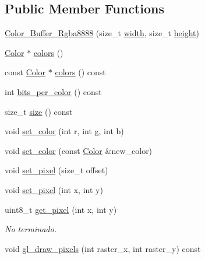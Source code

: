 \subsection*{Public Member Functions}
\begin{DoxyCompactItemize}
\item 
\mbox{\hyperlink{classexample_1_1_color___buffer___rgba8888_aa5397ac3ceb62d95d0f4773205d98177}{Color\+\_\+\+Buffer\+\_\+\+Rgba8888}} (size\+\_\+t \mbox{\hyperlink{classexample_1_1_color___buffer_ab61454d4b35cbba00d2e634d14ed20ac}{width}}, size\+\_\+t \mbox{\hyperlink{classexample_1_1_color___buffer_ae01f4538ee30af1d3072a425c5ad37ac}{height}})
\item 
\mbox{\hyperlink{structexample_1_1_color___buffer___rgba8888_1_1_color}{Color}} $\ast$ \mbox{\hyperlink{classexample_1_1_color___buffer___rgba8888_aec3a6be699750106d4a9ccd5f7f75f74}{colors}} ()
\item 
const \mbox{\hyperlink{structexample_1_1_color___buffer___rgba8888_1_1_color}{Color}} $\ast$ \mbox{\hyperlink{classexample_1_1_color___buffer___rgba8888_aea57e24bede44fa736473824e8f14a1f}{colors}} () const
\item 
int \mbox{\hyperlink{classexample_1_1_color___buffer___rgba8888_ab2e7a20a9dd24c5dd422d143d9a2d391}{bits\+\_\+per\+\_\+color}} () const
\item 
size\+\_\+t \mbox{\hyperlink{classexample_1_1_color___buffer___rgba8888_a635f30dda6b8e1851b444ff6e0d2a092}{size}} () const
\item 
void \mbox{\hyperlink{classexample_1_1_color___buffer___rgba8888_a408bf6adf54fc9958b74d21c8f6da178}{set\+\_\+color}} (int r, int g, int b)
\item 
void \mbox{\hyperlink{classexample_1_1_color___buffer___rgba8888_a5033d0d18293c92936fd2ff5318e3f0f}{set\+\_\+color}} (const \mbox{\hyperlink{structexample_1_1_color___buffer___rgba8888_1_1_color}{Color}} \&new\+\_\+color)
\item 
void \mbox{\hyperlink{classexample_1_1_color___buffer___rgba8888_ac741fa7bca9b980a475e6f7033b64347}{set\+\_\+pixel}} (size\+\_\+t offset)
\item 
void \mbox{\hyperlink{classexample_1_1_color___buffer___rgba8888_aceb94fbc6797177c5a401f4d10d56766}{set\+\_\+pixel}} (int x, int y)
\item 
uint8\+\_\+t \mbox{\hyperlink{classexample_1_1_color___buffer___rgba8888_afd80c65a9ba578b74f044ae8927e5a97}{get\+\_\+pixel}} (int x, int y)
\begin{DoxyCompactList}\small\item\em No terminado. \end{DoxyCompactList}\item 
void \mbox{\hyperlink{classexample_1_1_color___buffer___rgba8888_a66e133b6fd196f02a0ba454dd3fc550f}{gl\+\_\+draw\+\_\+pixels}} (int raster\+\_\+x, int raster\+\_\+y) const
\end{DoxyCompactItemize}
